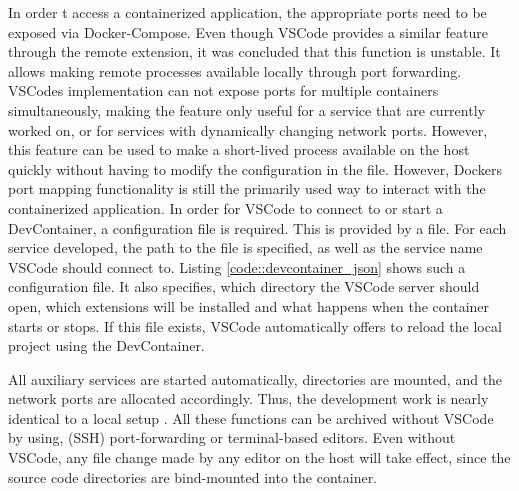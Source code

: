         In order t access a containerized application, the appropriate ports need to be exposed via Docker-Compose. Even though \ac{VSCode} provides a similar feature through the remote extension, it was concluded that this function is unstable. It allows making remote processes available locally through port forwarding. \ac{VSCode}s implementation can not expose ports for multiple containers simultaneously, making the feature only useful for a service that are currently worked on, or for services with dynamically changing network ports. However, this feature can be used to make a short-lived process available on the host quickly without having to modify the configuration in the  file. However, Dockers port mapping functionality is still the primarily used way to interact with the containerized application.\newline
        In order for \ac{VSCode} to connect to or start a DevContainer, a configuration file is required. This is provided by a  file. For each service developed, the path to the  file is specified, as well as the service name \ac{VSCode} should connect to. Listing \ref{code::devcontainer_json} shows such a configuration file. It also specifies, which directory the \ac{VSCode} server should open, which extensions will be installed and what happens when the container starts or stops. If this file exists, \ac{VSCode} automatically offers to reload the local project using the DevContainer.
        \vspace{.2cm}
        
        \noindent All auxiliary services are started automatically, directories are mounted, and the network ports are allocated accordingly. Thus, the development work is nearly identical to a local setup \cite{vscodedevcontainer}.\newline
        All these functions can be archived without \ac{VSCode} by using, (\ac{SSH}) port-forwarding or terminal-based editors. Even without VSCode, any file change made by any editor on the host will take effect, since the source code directories are bind-mounted into the container.

